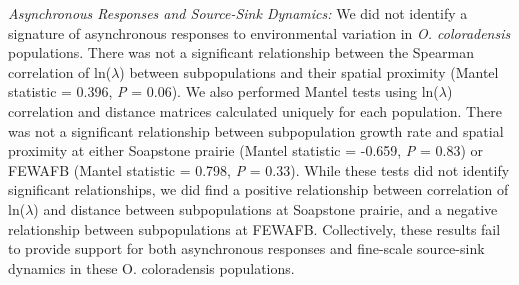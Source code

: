 \documentclass[12pt, letterpaper]{article}
\begin{document}
\textit{Asynchronous Responses and Source-Sink Dynamics:} We did not identify a signature of asynchronous responses to environmental variation in \textit{O. coloradensis} populations. There was not a significant relationship between the Spearman correlation of ln($\lambda$) between subpopulations and their spatial proximity (Mantel statistic = 0.396, \textit{P} = 0.06). We also performed Mantel tests using ln($\lambda$) correlation and distance matrices calculated uniquely for each population. There was not a significant relationship between subpopulation growth rate and spatial proximity at either Soapstone prairie (Mantel statistic = -0.659, \textit{P} = 0.83) or FEWAFB (Mantel statistic = 0.798, \textit{P} = 0.33). While these tests did not identify significant relationships, we did find a positive relationship between correlation of ln($\lambda$) and distance between subpopulations at Soapstone prairie, and a negative relationship between subpopulations at FEWAFB. Collectively, these results fail to provide support for both asynchronous responses and fine-scale source-sink dynamics in these O. coloradensis populations. 


\end{document}
